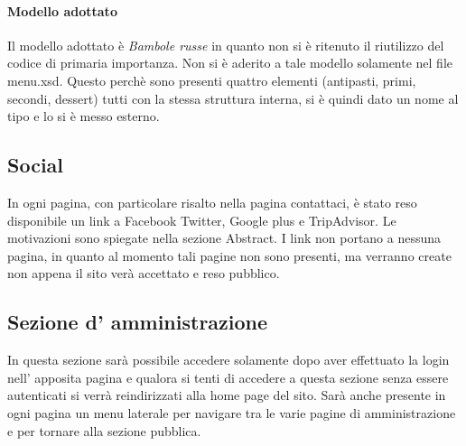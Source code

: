 \paragraph{Modello adottato}
Il modello adottato è \emph{Bambole russe} in quanto non si è ritenuto il riutilizzo del codice di primaria importanza.
Non si è aderito a tale modello solamente nel file menu.xsd. Questo perchè sono presenti quattro elementi (antipasti, primi, secondi, dessert) tutti con la stessa struttura interna, si è quindi dato un nome al tipo e lo si è messo esterno.

\subsection{Social}
In ogni pagina, con particolare risalto nella pagina contattaci, è stato reso disponibile un link a Facebook Twitter, Google plus e TripAdvisor. Le motivazioni sono spiegate nella sezione Abstract.
I link non portano a nessuna pagina, in quanto al momento tali pagine non sono presenti, ma verranno create non appena il sito verà accettato e reso pubblico.

\subsection{Sezione d' amministrazione}
In questa sezione sarà possibile accedere solamente dopo aver effettuato la login nell' apposita pagina e qualora si tenti di accedere a questa sezione senza essere autenticati si verrà reindirizzati alla home page del sito. Sarà anche presente in ogni pagina un menu laterale per navigare tra le varie pagine di amministrazione e per tornare alla sezione pubblica.
